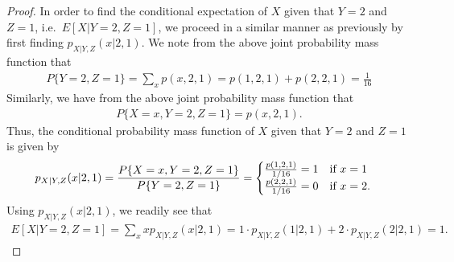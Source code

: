 \begin{proof}
  In order to find the conditional expectation of $X$ given that $Y=2$ and $Z=1$, i.e.\ $E[X | Y=2, Z=1]$,
  we proceed in a similar manner as previously by first finding $p_{X|Y,Z}(x|2,1)$. We note from the above joint probability mass function
  that
  \begin{align*}
    P\{Y=2, Z=1\} = \sum_{x}p(x,2,1) = p(1, 2, 1) + p(2, 2, 1) = \frac{1}{16}
  \end{align*}
  Similarly, we have from the above joint probability mass function that
  \begin{align*}
    P\{X=x, Y=2, Z=1\} = p(x, 2, 1).
  \end{align*}
  Thus, the conditional probability mass function of $X$ given that $Y=2$ and $Z=1$ is given by
  \begin{align*}
    p_{X|Y,Z}(x|2,1) = \frac{P\{X=x, Y=2, Z=1\}}{P\{Y=2, Z=1\}} =
    \begin{cases}
      \frac{p(1,2,1)}{1/16} = 1 \text{\quad if $x=1$}\\
      \frac{p(2,2,1)}{1/16} = 0 \text{\quad if $x=2$}.
    \end{cases}
  \end{align*}
  Using $p_{X|Y,Z}(x|2,1)$, we readily see that
  \begin{align*}
    E[X|Y=2,Z=1] = \sum_x x p_{X|Y,Z}(x|2,1) = 1 \cdot p_{X|Y,Z}(1|2,1)  + 2 \cdot p_{X|Y,Z}(2|2,1) = 1.
  \end{align*}

\end{proof}
\newpage
